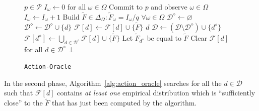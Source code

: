 \begin{figure}
	\vspace{-.7cm}
	\begin{minipage}{0.42\textwidth}
		\begin{algorithm}[H]
			\caption{\texttt{Action-Oracle}}\label{alg:action_oracle}
			\small
			\begin{algorithmic}[1]
				\Require $p \in \mathcal{P}$
				\State ${I}_{\omega} \gets 0$ for all $\omega \in \Omega$\label{line:action_or_first}\Comment{\textcolor{gray}{Phase 1: Estimate}}
				\State Commit to $p $ and observe $\omega \in \Omega$
				\State  ${I}_{\omega} \gets {I}_{\omega}+1$
				\EndFor
				\State Build $\widetilde{F} \in \Delta_\Omega:  \widetilde F_{\omega} = {I}_{\omega}/q$  $\forall \omega \in \Omega$\label{line:action_or_first_last}
				\State $\mathcal{D}^\diamond \gets \varnothing$\label{line:action_or_second}\Comment{\textcolor{gray}{Phase 2: Compare}}
				\State $\mathcal{D}^\diamond \gets \mathcal{D}^\diamond \cup \{ d \}$
				\EndIf
				\EndFor
				\State $\mathcal{F}[d] \gets \mathcal{F}[d] \cup \{ \widetilde{F} \}$\label{line:add}
				\State \Return $ d$
				\EndIf
				\State $\mathcal{D} \gets \left( \mathcal{D} \setminus \mathcal{D}^\diamond \right) \cup \{ d^\diamond \}$ \Comment{\textcolor{gray}{$d^\diamond$ is new}}\label{line:new_meta}
				\State $\mathcal{F}[{d^\diamond}] \gets \bigcup_{d \in \mathcal{D}^\diamond} \mathcal{F}[d] \cup \{ \widetilde F \}$ 
				\State Let $\widetilde F_{d^\diamond}$ be equal to $\widetilde F$\label{line:assoc_ditrib}
				\State Clear $\mathcal{F}[d]$ for all $d \in \mathcal{D}^\diamond$\label{line:clear}
				\State \Return $\bot$\label{line:action_or_second_last}
			\end{algorithmic}
		\end{algorithm}
	\end{minipage}
\end{figure}
%
In the second phase, Algorithm~\ref{alg:action_oracle} searches for all the $d \in \mathcal{D}$ such that $\mathcal{F}[d]$ contains \emph{at least one} empirical distribution which is ``sufficiently close'' to the $\widetilde{F}$ that has just been computed by the algorithm.
%
